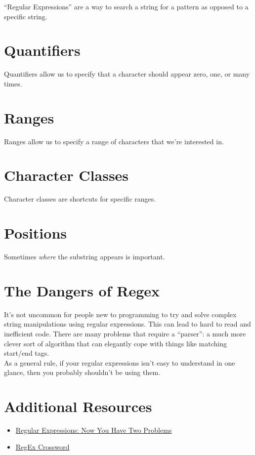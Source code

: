 ``Regular Expressions'' are a way to search a string for a pattern as opposed to a specific string.


\section{Quantifiers}

Quantifiers allow us to specify that a character should appear zero, one, or many times.


\section{Ranges}

Ranges allow us to specify a range of characters that we're interested in.


\section{Character Classes}

Character classes are shortcuts for specific ranges.


\section{Positions}

Sometimes \textit{where} the substring appears is important.


\section{The Dangers of Regex}



It's not uncommon for people new to programming to try and solve complex string manipulations using regular expressions. This can lead to hard to read and inefficient code. There are many problems that require a ``parser'': a much more clever sort of algorithm that can elegantly cope with things like matching start/end tags.
\\

As a general rule, if your regular expressions isn't easy to understand in one glance, then you probably shouldn't be using them.



\section{Additional Resources}

\begin{itemize}[leftmargin=*]
    \item \href{https://blog.codinghorror.com/regular-expressions-now-you-have-two-problems/}{Regular Expressions: Now You Have Two Problems}
    \item \href{http://www.regexcrossword.com/}{RegEx Crossword}
\end{itemize}
